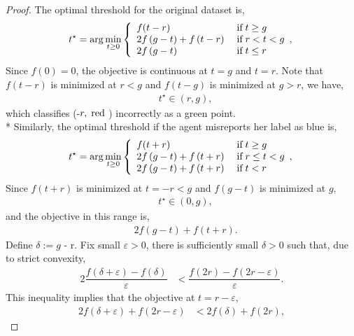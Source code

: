 \documentclass{article}
\begin{document}
\begin{proof} \label{proof:ex1pf} 
The optimal threshold for the original dataset is,
\[ t^\star  = \arg\displaystyle\min_{t \geq  0}\left\{ \begin{array}{ll}
f(t - r)& \text{\;if\;} t \geq  g \\
2 f\left(g - t\right) + f\left(t - r\right)& \text{\;if\;} r < t < g \\
2 f\left(g - t\right)& \text{\;if\;} t \leq  r \\
\end{array},\right. \]
Since $f\left(0\right)  = 0$, the objective is continuous at $t  = g $ and $t  = r $. Note that $f\left(t - r\right) $ is minimized at $r  < g$ and $f\left(t - g\right) $ is minimized at $g  > r$, we have,
\begin{align*}
&t^\star  \in \left(r , g \right),
\end{align*}
which classifies (-$r , \text{\;red\;}$) incorrectly as a green point.
\\* Similarly, the optimal threshold if the agent misreports her label as blue is,
\[ t^\star  = \arg\displaystyle\min_{t \geq  0}\left\{ \begin{array}{ll}
f(t + r)& \text{\;if\;} t \geq  g \\
2 f\left(g - t\right) + f\left(t + r\right)& \text{\;if\;} r \leq  t < g \\
2 f\left(g - t\right) + f\left(t + r\right)& \text{\;if\;} t < r \\
\end{array},\right. \]
Since $f\left(t + r\right) $ is minimized at $t  = -r < g $ and $f\left(g - t\right) $ is minimized at $g, $
\begin{align*}
&t^\star  \in \left(0, g \right),
\end{align*}
and the objective in this range is,
\begin{align*}
&2 f\left(g - t\right) + f\left(t + r\right).
\end{align*}
Define $\delta := g$ - r. Fix small $\varepsilon > 0$, there is sufficiently small $\delta > 0$ such that, due to strict convexity,
\begin{align*}
2 \dfrac{f\left(\delta + \varepsilon\right) - f\left(\delta\right)}{\varepsilon} &< \dfrac{f\left(2 r\right) - f\left(2 r - \varepsilon\right)}{\varepsilon} .
\end{align*}
This inequality implies that the objective at $t  = r  - \varepsilon$,
\begin{align*}
2 f\left(\delta + \varepsilon\right) + f\left(2 r - \varepsilon\right) &< 2 f\left(\delta\right) + f\left(2 r \right),

\end{align*}
\end{proof}
\end{document}
